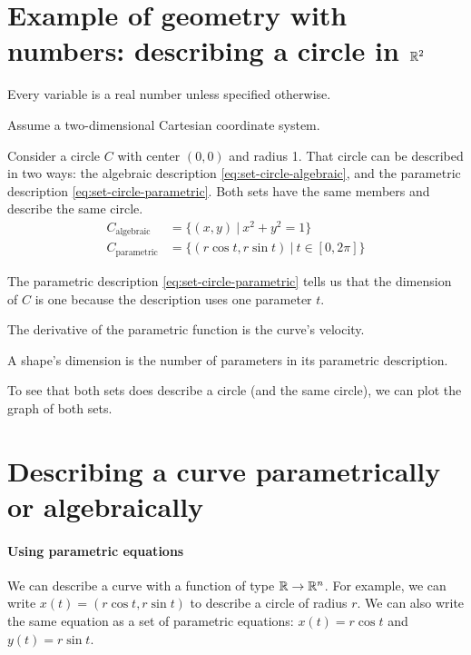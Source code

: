 \section{Example of geometry with numbers: describing a circle in \(\mathbb{R}^2\)}

Every variable is a real number unless specified otherwise.

Assume a two-dimensional Cartesian coordinate system.

Consider a circle \(C\) with center \((0,0)\) and radius 1.
That circle can be described in two ways:
the algebraic description \eqref{eq:set-circle-algebraic},
and the parametric description \eqref{eq:set-circle-parametric}.
Both sets have the same members and describe the same circle.
\begin{align}
    \label{eq:set-circle-algebraic}
    C_{\text{algebraic}} &= \{ (x,y) ~|~ x^2 + y^2 = 1 \}
    \\
    \label{eq:set-circle-parametric}
    C_{\text{parametric}} &= \{ (r \cos t, r \sin t) ~|~ t \in [0,2\pi] \}
\end{align}

The parametric description \eqref{eq:set-circle-parametric}
tells us that the dimension of \(C\) is one
because the description uses one parameter \(t\).


The derivative of the parametric function is the curve's velocity.

A shape's dimension is the number of parameters in its parametric description.

To see that both sets does describe a circle (and the same circle),
we can plot the graph of both sets.

\section*{Describing a curve parametrically or algebraically}

\paragraph{Using parametric equations}

We can describe a curve with a function of type \( \mathbb{R} \to \mathbb{R}^n \).
For example, we can write \(x(t) = (r \cos t, r \sin t)\) to describe a circle of radius \(r\).
We can also write the same equation as a set of parametric equations:
\(x(t) = r \cos t\) and \(y(t) = r \sin t\).

